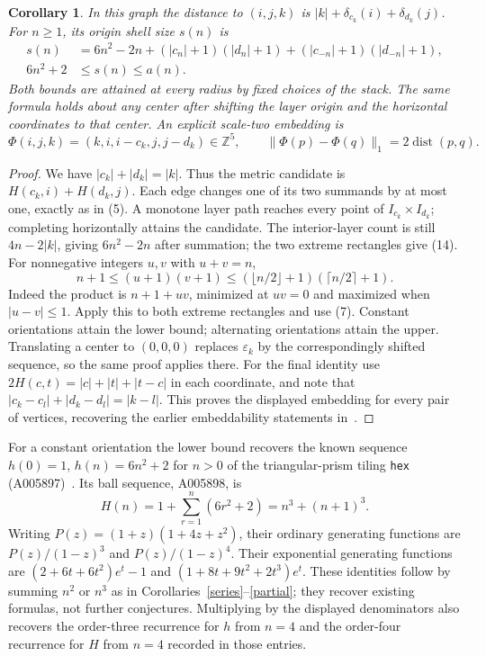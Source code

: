 \documentclass[10pt]{article}
\newtheorem{corollary}[theorem]{Corollary}
\newcommand{\Z}{\mathbb Z}
\newcommand{\dist}{\operatorname{dist}}
\begin{document}
\begin{corollary}\label{stacks}
In this graph the distance to $(i,j,k)$ is
$|k|+\delta_{c_k}(i)+\delta_{d_k}(j)$.
For $n\geq1$, its origin shell size $s(n)$ is
\begin{align}
 s(n)&=6n^2-2n+(|c_n|+1)(|d_n|+1)
                     +(|c_{-n}|+1)(|d_{-n}|+1), \tag{14}\\
 6n^2+2&\leq s(n)\leq a(n). \tag{15}
\end{align}
Both bounds are attained at every radius by fixed choices of the stack.
The same formula holds about any center after shifting the layer origin
and the horizontal coordinates to that center.
An explicit scale-two embedding is
\[
 \Phi(i,j,k)=(k,i,i-c_k,j,j-d_k)\in\Z^5,
 \qquad \|\Phi(p)-\Phi(q)\|_1=2\dist(p,q).
\]
\end{corollary}
\begin{proof}
We have $|c_k|+|d_k|=|k|$. Thus the metric candidate is
$H(c_k,i)+H(d_k,j)$. Each edge changes one of its two summands by
at most one, exactly as in (5). A monotone layer path reaches every
point of $I_{c_k}\times I_{d_k}$; completing horizontally attains the
candidate. The interior-layer count is still $4n-2|k|$, giving
$6n^2-2n$ after summation; the two extreme rectangles give (14).
For nonnegative integers $u,v$ with $u+v=n$,
\[
 n+1\leq(u+1)(v+1)
 \leq(\lfloor n/2\rfloor+1)(\lceil n/2\rceil+1).
\]
Indeed the product is $n+1+uv$, minimized at $uv=0$ and maximized
when $|u-v|\leq1$. Apply this to both extreme rectangles and use (7).
Constant orientations attain the lower bound; alternating orientations
attain the upper. Translating a center to $(0,0,0)$ replaces
$\varepsilon_k$ by the correspondingly shifted sequence, so the
same proof applies there.
For the final identity use
$2H(c,t)=|c|+|t|+|t-c|$ in each coordinate, and note that
$|c_k-c_l|+|d_k-d_l|=|k-l|$. This proves the displayed
embedding for every pair of vertices, recovering the earlier
embeddability statements in~\cite{deza}.
\end{proof}

For a constant orientation the lower bound recovers the known sequence
$h(0)=1$, $h(n)=6n^2+2$ for $n>0$ of the triangular-prism tiling
\texttt{hex} (A005897)~\cite{hex}. Its ball sequence, A005898, is
\[
 H(n)=1+\sum_{r=1}^n(6r^2+2)=n^3+(n+1)^3.
\]
Writing $P(z)=(1+z)(1+4z+z^2)$, their ordinary generating
functions are $P(z)/(1-z)^3$ and $P(z)/(1-z)^4$.
Their exponential generating functions are
$(2+6t+6t^2)e^t-1$ and $(1+8t+9t^2+2t^3)e^t$.
These identities follow by summing $n^2$ or $n^3$ as in
Corollaries~\ref{series}--\ref{partial}; they recover existing formulas,
not further conjectures. Multiplying by the displayed denominators
also recovers the order-three recurrence for $h$ from $n=4$ and the
order-four recurrence for $H$ from $n=4$ recorded in those entries.
\end{document}
